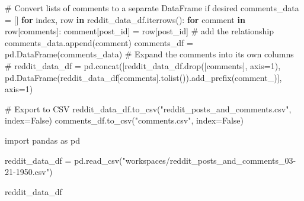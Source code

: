 \documentclass[
  12pt,
  letterpaper,
  DIV=11,
  numbers=noendperiod]{scrartcl}
\newenvironment{Shaded}{\begin{snugshade}}{\end{snugshade}}
\newcommand{\CommentTok}[1]{\textcolor[rgb]{0.37,0.37,0.37}{#1}}
\newcommand{\ControlFlowTok}[1]{\textcolor[rgb]{0.00,0.23,0.31}{\textbf{#1}}}
\newcommand{\ImportTok}[1]{\textcolor[rgb]{0.00,0.46,0.62}{#1}}
\newcommand{\KeywordTok}[1]{\textcolor[rgb]{0.00,0.23,0.31}{\textbf{#1}}}
\newcommand{\NormalTok}[1]{\textcolor[rgb]{0.00,0.23,0.31}{#1}}
\newcommand{\OperatorTok}[1]{\textcolor[rgb]{0.37,0.37,0.37}{#1}}
\newcommand{\StringTok}[1]{\textcolor[rgb]{0.13,0.47,0.30}{#1}}
\newcommand{\VariableTok}[1]{\textcolor[rgb]{0.07,0.07,0.07}{#1}}
\begin{document}
\begin{Shaded}
\begin{Highlighting}[]
\CommentTok{\# Convert lists of comments to a separate DataFrame if desired}
\NormalTok{comments\_data }\OperatorTok{=}\NormalTok{ []}
\ControlFlowTok{for}\NormalTok{ index, row }\KeywordTok{in}\NormalTok{ reddit\_data\_df.iterrows():}
    \ControlFlowTok{for}\NormalTok{ comment }\KeywordTok{in}\NormalTok{ row[}\StringTok{\textquotesingle{}comments\textquotesingle{}}\NormalTok{]:}
\NormalTok{        comment[}\StringTok{\textquotesingle{}post\_id\textquotesingle{}}\NormalTok{] }\OperatorTok{=}\NormalTok{ row[}\StringTok{\textquotesingle{}post\_id\textquotesingle{}}\NormalTok{] }\CommentTok{\# add the relationship}
\NormalTok{        comments\_data.append(comment)}
\NormalTok{comments\_df }\OperatorTok{=}\NormalTok{ pd.DataFrame(comments\_data)}
\CommentTok{\# Expand the comments into its own columns}
\CommentTok{\# reddit\_data\_df = pd.concat([reddit\_data\_df.drop([\textquotesingle{}comments\textquotesingle{}], axis=1), pd.DataFrame(reddit\_data\_df[\textquotesingle{}comments\textquotesingle{}].tolist()).add\_prefix(\textquotesingle{}comment\_\textquotesingle{})], axis=1)}

\CommentTok{\# Export to CSV}
\NormalTok{reddit\_data\_df.to\_csv(}\StringTok{"reddit\_posts\_and\_comments.csv"}\NormalTok{, index}\OperatorTok{=}\VariableTok{False}\NormalTok{)}
\NormalTok{comments\_df.to\_csv(}\StringTok{"comments.csv"}\NormalTok{, index}\OperatorTok{=}\VariableTok{False}\NormalTok{)}
\end{Highlighting}
\end{Shaded}

\begin{Shaded}
\begin{Highlighting}[]
\ImportTok{import}\NormalTok{ pandas }\ImportTok{as}\NormalTok{ pd}

\NormalTok{reddit\_data\_df }\OperatorTok{=}\NormalTok{ pd.read\_csv(}\StringTok{"workspaces/reddit\_posts\_and\_comments\_03{-}21{-}1950.csv"}\NormalTok{)}

\NormalTok{reddit\_data\_df}
\end{Highlighting}
\end{Shaded}
\end{document}

